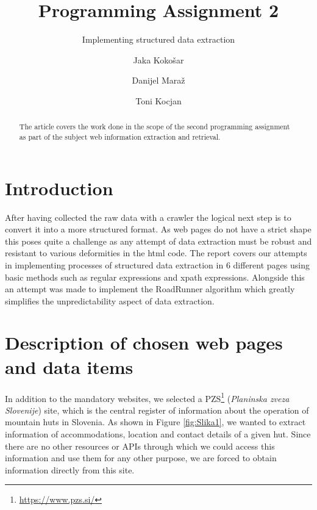 \documentclass[runningheads]{llncs}
\begin{document}
\title{Programming Assignment 2}
\subtitle{Implementing structured data extraction}

\author{
  Jaka Kokošar
  \and
  Danijel Maraž
  \and
  Toni Kocjan
}



\maketitle             

\begin{abstract}
The article covers the work done in the scope of the second programming assignment as part of the subject web information extraction and retrieval. 

\end{abstract}

\section{Introduction}
After having collected the raw data with a crawler the logical next step is to convert it into a more structured format. As web pages do not have a strict shape this poses quite a challenge as any attempt of data extraction must be robust and resistant to various deformities in the html code. The report covers our attempts in implementing processes of structured data extraction in 6 different pages using basic methods such as regular expressions and xpath expressions. Alongside this an attempt was made to implement the RoadRunner algorithm which greatly simplifies the unpredictability aspect of data extraction.
\section{Description of chosen web pages and data items}
In addition to the mandatory websites, we selected a PZS\footnote{\url{https://www.pzs.si/}} ({\em Planinska zveza Slovenije}) site, which is the central register of information about the operation of mountain huts in Slovenia. As shown in Figure \ref{fig:Slika1}, we wanted to extract information of accommodations, location and contact details of a given hut. Since there are no other resources or APIs through which we could access this information and use them for any other purpose, we are forced to obtain information directly from this site.
\end{document}
